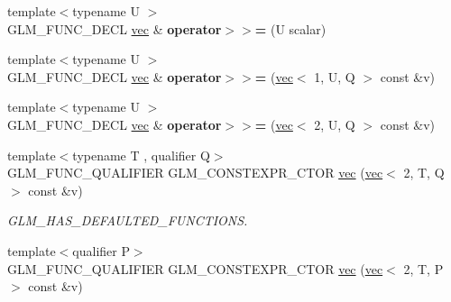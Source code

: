 \begin{DoxyCompactItemize}
\mbox{\label{structglm_1_1vec_3_012_00_01T_00_01Q_01_4_a5cda1333155cc198e688a415467f93be}} 
{\footnotesize template$<$typename U $>$ }\\G\+L\+M\+\_\+\+F\+U\+N\+C\+\_\+\+D\+E\+CL \hyperlink{structglm_1_1vec}{vec} \& {\bfseries operator$>$$>$=} (U scalar)
\item 
\mbox{\label{structglm_1_1vec_3_012_00_01T_00_01Q_01_4_a6f9dfd8f7093aad6a2d57e830a990016}} 
{\footnotesize template$<$typename U $>$ }\\G\+L\+M\+\_\+\+F\+U\+N\+C\+\_\+\+D\+E\+CL \hyperlink{structglm_1_1vec}{vec} \& {\bfseries operator$>$$>$=} (\hyperlink{structglm_1_1vec}{vec}$<$ 1, U, Q $>$ const \&v)
\item 
\mbox{\label{structglm_1_1vec_3_012_00_01T_00_01Q_01_4_a39d690e7942ded7dbff157a33236b797}} 
{\footnotesize template$<$typename U $>$ }\\G\+L\+M\+\_\+\+F\+U\+N\+C\+\_\+\+D\+E\+CL \hyperlink{structglm_1_1vec}{vec} \& {\bfseries operator$>$$>$=} (\hyperlink{structglm_1_1vec}{vec}$<$ 2, U, Q $>$ const \&v)
\item 
\mbox{\label{structglm_1_1vec_3_012_00_01T_00_01Q_01_4_a1dc70d40254a106cf1589d2fb91cadf8}} 
{\footnotesize template$<$typename T , qualifier Q$>$ }\\G\+L\+M\+\_\+\+F\+U\+N\+C\+\_\+\+Q\+U\+A\+L\+I\+F\+I\+ER G\+L\+M\+\_\+\+C\+O\+N\+S\+T\+E\+X\+P\+R\+\_\+\+C\+T\+OR \hyperlink{structglm_1_1vec_3_012_00_01T_00_01Q_01_4_a1dc70d40254a106cf1589d2fb91cadf8}{vec} (\hyperlink{structglm_1_1vec}{vec}$<$ 2, T, Q $>$ const \&v)
\begin{DoxyCompactList}\small\item\em G\+L\+M\+\_\+\+H\+A\+S\+\_\+\+D\+E\+F\+A\+U\+L\+T\+E\+D\+\_\+\+F\+U\+N\+C\+T\+I\+O\+NS. \end{DoxyCompactList}\item 
\mbox{\label{structglm_1_1vec_3_012_00_01T_00_01Q_01_4_a207754db3db8bcf1251e3b46a1e2c58c}} 
{\footnotesize template$<$qualifier P$>$ }\\G\+L\+M\+\_\+\+F\+U\+N\+C\+\_\+\+Q\+U\+A\+L\+I\+F\+I\+ER G\+L\+M\+\_\+\+C\+O\+N\+S\+T\+E\+X\+P\+R\+\_\+\+C\+T\+OR \hyperlink{structglm_1_1vec_3_012_00_01T_00_01Q_01_4_a207754db3db8bcf1251e3b46a1e2c58c}{vec} (\hyperlink{structglm_1_1vec}{vec}$<$ 2, T, P $>$ const \&v)

\end{DoxyCompactItemize}
